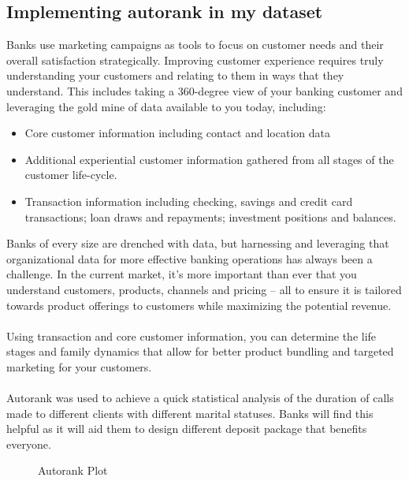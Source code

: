 \documentclass[12pt]{article}
\begin{document}
\subsection{Implementing autorank in my dataset}
Banks use marketing campaigns as tools to focus on customer needs and their overall satisfaction strategically. Improving customer experience requires truly understanding your customers and relating to them in ways that they understand. This includes taking a 360-degree view of your banking customer and leveraging the gold mine of data available to you today, including: 
\begin{itemize}

\item Core customer information including contact and location data
\item Additional experiential customer information gathered from all stages of the customer life-cycle.
\item Transaction information including checking, savings and credit card transactions; loan draws and repayments; investment positions and balances. 

\end{itemize}
Banks of every size are drenched with data, but harnessing and leveraging that organizational data for more effective banking operations has always been a challenge. In the current market, it’s more important than ever that you understand customers, products, channels and pricing – all to ensure it is tailored towards product offerings to customers while maximizing the potential revenue.\\\\
Using transaction and core customer information, you can determine the life stages and family dynamics that allow for better product bundling and targeted marketing for your customers.\\\\
Autorank was used to achieve a quick statistical analysis of the duration of calls made to different clients with different marital statuses. Banks will find this helpful as it will aid them to design different deposit package that benefits everyone.

\begin{figure}[!htbp]
	\centering
{}
	\caption{Autorank Plot}
\end{figure}
\end{document}
